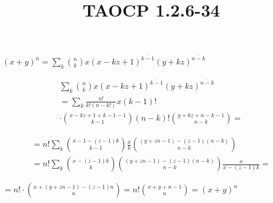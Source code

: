 \documentclass{article}
\title{TAOCP 1.2.6\mbox{-}34}
\begin{document}
\maketitle

\( {(x+y)}^{\overline{n}} = \sum_{k} \binom{n}{k} x{(x-kz+1)}^{\overline{k-1}}{(y+kz)}^{\overline{n-k}} \)

\begin{multline*}
\sum_{k} \binom{n}{k} x{(x-kz+1)}^{\overline{k-1}}{(y+kz)}^{\overline{n-k}} \\
= \sum_{k} \frac{n!}{k!(n-k!)}x(k-1)! \\
\cdot \binom{x-kz+1+k-1-1}{k-1}(n-k)!\binom{y+kz+n-k-1}{n-k} =
\end{multline*}

\begin{multline*}
= n! \sum_{k} \binom{x-1-(z-1)k}{k-1}\frac{x}{k}\binom{(y+zn-1)-(z-1)(n-k)}{n-k} \\
= n! \sum_{k} \binom{x - (z-1)k}{k}\binom{(y+zn-1)-(z-1)(n-k)}{n-k} \frac{x}{x - (z-1)k} =
\end{multline*}

\( = n! \cdot \binom{x+(y+zn-1)-(z-1)n}{n} = n! \binom{x+y+n-1}{n} = {(x+y)}^{\overline{n}} \)
\end{document}

